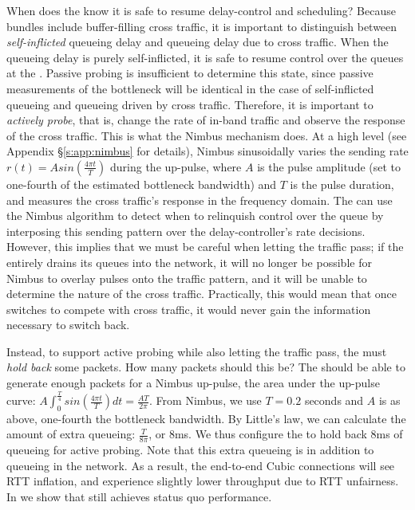 
When does the \inbox know it is safe to resume delay-control and scheduling?
Because bundles include buffer-filling cross traffic, it is important to distinguish between \emph{self-inflicted} queueing delay and queueing delay due to cross traffic.
When the queueing delay is purely self-inflicted, it is safe to resume control over the queues at the \inbox.
Passive probing is insufficient to determine this state, since passive measurements of the bottleneck will be identical in the case of self-inflicted queueing and queueing driven by cross traffic.
Therefore, it is important to \emph{actively probe}, that is, change the rate of in-band traffic and observe the response of the cross traffic. 
This is what the Nimbus mechanism does.
At a high level (see Appendix \S\ref{s:app:nimbus} for details),
Nimbus sinusoidally varies the sending rate $r(t) = A sin(\frac{4\pi{}t}{T})$ during the up-pulse, where $A$ is the pulse amplitude (set to one-fourth of the estimated bottleneck bandwidth) and $T$ is the pulse duration, and measures the cross traffic's response in the frequency domain.
The \inbox can use the Nimbus algorithm to detect when to relinquish control over the queue by interposing this sending pattern over the delay-controller's rate decisions.
However, this implies that we must be careful when letting the traffic pass; if the \inbox entirely drains its queues into the network, it will no longer be possible for Nimbus to overlay pulses onto the traffic pattern, and it will be unable to determine the nature of the cross traffic.
Practically, this would mean that once \inbox switches to compete with cross traffic, it would never gain the information necessary to switch back.

Instead, to support active probing while also letting the traffic pass, the \inbox must \emph{hold back} some packets.
How many packets should this be? The \inbox should be able to generate enough packets for a Nimbus up-pulse, \ie the area under the up-pulse curve: 
$A \int_0^{\frac{T}{4}} sin(\frac{4\pi{}t}{T}) dt = \frac{AT}{2\pi}$.
From Nimbus, we use $T = 0.2$ seconds and $A$ is as above, one-fourth the bottleneck bandwidth. By Little's law, we can calculate the amount of extra queueing: $\frac{T}{8\pi}$, or $8$ms.
We thus configure the \inbox to hold back $8$ms of queueing for active probing.
Note that this extra queueing is in addition to queueing in the network. As a result, the end-to-end Cubic connections will see RTT inflation, and experience slightly lower throughput due to RTT unfairness. In  we show that \name still achieves status quo performance.

